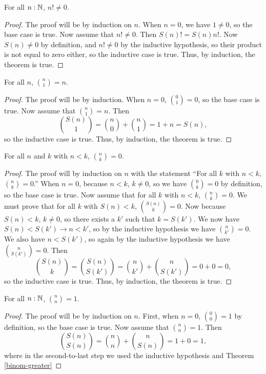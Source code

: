 \documentclass[../math.tex]{subfiles}
\begin{document}
\begin{theorem} \label{factorial-nz}
    For all $n : \mathbb{N}$, $n! \neq 0$.
\end{theorem}
\begin{proof}
    The proof will be by induction on $n$.  When $n = 0$, we have $1 \neq 0$, so
    the base case is true.  Now assume that $n! \neq 0$.  Then $S(n)! = S(n)
    n!$.  Now $S(n) \neq 0$ by definition, and $n! \neq 0$ by the inductive
    hypothesis, so their product is not equal to zero either, so the inductive
    case is true.  Thus, by induction, the theorem is true.
\end{proof}

\begin{theorem}
    For all $n$, $\displaystyle \binom{n}{1} = n$.
\end{theorem}
\begin{proof}
    The proof will be by induction.  When $n = 0$, $\binom{0}{1} = 0$, so the
    base case is true.  Now assume that $\binom{n}{1} = n$.  Then
    \[
        \binom{S(n)}{1} = \binom{n}{0} + \binom{n}{1} = 1 + n = S(n),
    \]
    so the inductive case is true.  Thus, by induction, the theorem is true.
\end{proof}

\begin{theorem} \label{binom-greater}
    For all $n$ and $k$ with $n < k$, $\displaystyle \binom{n}{k} = 0$.
\end{theorem}
\begin{proof}
    The proof will by induction on $n$ with the statement ``For all $k$ with $n
    < k$, $\binom{n}{k} = 0$.''  When $n = 0$, because $n < k$, $k \neq 0$, so
    we have $\binom{0}{k} = 0$ by definition, so the base case is true.  Now
    assume that for all $k$ with $n < k$, $\binom{n}{k} = 0$.  We must prove
    that for all $k$ with $S(n) < k$, $\binom{S(n)}{k} = 0$.  Now because $S(n)
    < k$, $k \neq 0$, so there exists a $k'$ such that $k = S(k')$.  We now have
    $S(n) < S(k') \rightarrow n < k'$, so by the inductive hypothesis we have
    $\binom{n}{k'} = 0$.  We also have $n < S(k')$, so again by the inductive
    hypothesis we have $\binom{n}{S(k')} = 0$.  Then
    \[
        \binom{S(n)}{k} = \binom{S(n)}{S(k')} = \binom{n}{k'} + \binom{n}{S(k')}
        = 0 + 0 = 0,
    \]
    so the inductive case is true.  Thus, by induction, the theorem is true.
\end{proof}

\begin{theorem}
    For all $n : \mathbb{N}$, $\displaystyle \binom{n}{n} = 1$.
\end{theorem}
\begin{proof}
    The proof will be by induction on $n$.  First, when $n = 0$, $\binom{0}{0} =
    1$ by definition, so the base case is true.  Now assume that $\binom{n}{n} =
    1$.  Then
    \[
        \binom{S(n)}{S(n)} = \binom{n}{n} + \binom{n}{S(n)} = 1 + 0 = 1,
    \]
    where in the second-to-last step we used the inductive hypothesis and
    Theorem \ref{binom-greater}
\end{proof}
\end{document}

